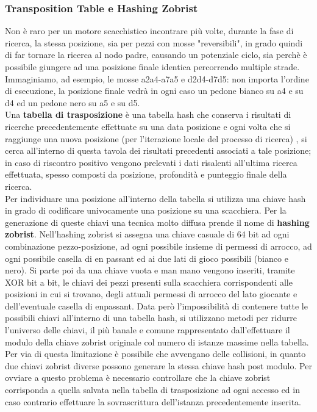 \subsubsection{Transposition Table e Hashing Zobrist}
Non è raro per un motore scacchistico incontrare più volte, durante la fase di ricerca, la stessa posizione, sia per pezzi con mosse "reversibili", in grado quindi di far tornare la ricerca al nodo padre,
causando un potenziale ciclo, sia perchè è possibile giungere ad una posizione finale identica percorrendo multiple strade. Immaginiamo, ad esempio, le mosse a2a4-a7a5 e d2d4-d7d5: non importa l'ordine di esecuzione,
la posizione finale vedrà in ogni caso un pedone bianco su a4 e su d4 ed un pedone nero su a5 e su d5.
\\ Una \textbf{tabella di trasposizione} è una tabella hash che conserva i risultati di ricerche precedentemente effettuate
su una data posizione e ogni volta che si raggiunge una nuova posizione (per l'iterazione locale del processo di ricerca) , si cerca all'interno di questa tavola dei risultati precedenti associati a tale posizione; in caso di riscontro positivo
vengono prelevati i dati risalenti all'ultima ricerca effettuata, spesso composti da posizione, profondità e punteggio finale della ricerca.
\\Per individuare una posizione all'interno della tabella si utilizza una chiave hash in grado di codificare univocamente una posizione su una scacchiera. Per la generazione di queste chiavi una tecnica molto diffusa prende il nome di \textbf{hashing zobrist}.
Nell'hashing zobrist si assegna una chiave casuale di 64 bit ad ogni combinazione pezzo-posizione, ad ogni possibile insieme di permessi di arrocco, ad ogni possibile casella di en passant ed ai due lati di gioco possibili (bianco e nero).
Si parte poi da una chiave vuota e man mano vengono inseriti, tramite XOR bit a bit, le chiavi dei pezzi presenti sulla scacchiera corrispondenti alle posizioni in cui si trovano, degli attuali permessi di arrocco
del lato giocante e dell'eventuale casella di enpassant. Data però l'impossibilità di contenere tutte le possibili chiavi all'interno di una tabella hash, si utilizzano metodi per ridurre l'universo delle chiavi,
il più banale e comune rappresentato dall'effettuare il modulo della chiave zobrist originale col numero di istanze massime nella tabella. Per via di questa limitazione è possibile che avvengano delle collisioni,
in quanto due chiavi zobrist diverse possono generare la stessa chiave hash post modulo. Per ovviare a questo problema è necessario controllare che la chiave zobrist corrisponda a quella salvata nella tabella di 
trasposizione ad ogni accesso ed in caso contrario effettuare la sovrascrittura dell'istanza precedentemente inserita.



